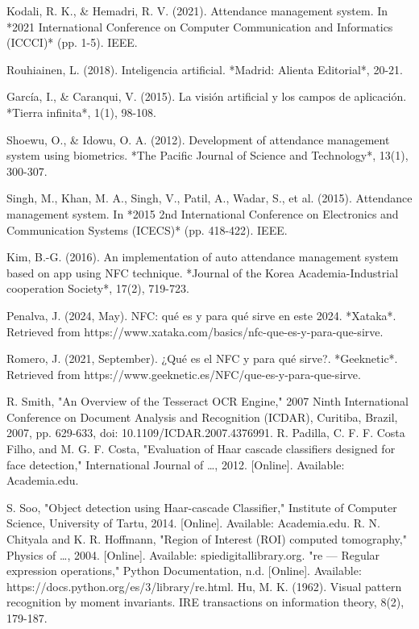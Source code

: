 \documentclass[12pt, letterpaper]{article}
\begin{document}
\newpage
\begin{thebibliography}{00}
 Kodali, R. K., \& Hemadri, R. V. (2021). Attendance management system. In *2021 International Conference on Computer Communication and Informatics (ICCCI)* (pp. 1-5). IEEE.

 Rouhiainen, L. (2018). Inteligencia artificial. *Madrid: Alienta Editorial*, 20-21.

 García, I., \& Caranqui, V. (2015). La visión artificial y los campos de aplicación. *Tierra infinita*, 1(1), 98-108.

 Shoewu, O., \& Idowu, O. A. (2012). Development of attendance management system using biometrics. *The Pacific Journal of Science and Technology*, 13(1), 300-307.

 Singh, M., Khan, M. A., Singh, V., Patil, A., Wadar, S., et al. (2015). Attendance management system. In *2015 2nd International Conference on Electronics and Communication Systems (ICECS)* (pp. 418-422). IEEE.

 Kim, B.-G. (2016). An implementation of auto attendance management system based on app using NFC technique. *Journal of the Korea Academia-Industrial cooperation Society*, 17(2), 719-723.

 Penalva, J. (2024, May). NFC: qué es y para qué sirve en este 2024. *Xataka*. Retrieved from https://www.xataka.com/basics/nfc-que-es-y-para-que-sirve.

 Romero, J. (2021, September). ¿Qué es el NFC y para qué sirve?. *Geeknetic*. Retrieved from https://www.geeknetic.es/NFC/que-es-y-para-que-sirve.

 R. Smith, "An Overview of the Tesseract OCR Engine," 2007 Ninth International Conference on Document Analysis and Recognition (ICDAR), Curitiba, Brazil, 2007, pp. 629-633, doi: 10.1109/ICDAR.2007.4376991.
 R. Padilla, C. F. F. Costa Filho, and M. G. F. Costa, "Evaluation of Haar cascade classifiers designed for face detection," International Journal of …, 2012. [Online]. Available: Academia.edu.

S. Soo, "Object detection using Haar-cascade Classifier," Institute of Computer Science, University of Tartu, 2014. [Online]. Available: Academia.edu.
 R. N. Chityala and K. R. Hoffmann, "Region of Interest (ROI) computed tomography," Physics of …, 2004. [Online]. Available: spiedigitallibrary.org.
 "re — Regular expression operations," Python Documentation, n.d. [Online]. Available: https://docs.python.org/es/3/library/re.html.
 Hu, M. K. (1962). Visual pattern recognition by moment invariants. IRE transactions on information theory, 8(2), 179-187. 


\end{thebibliography}
\end{document}
